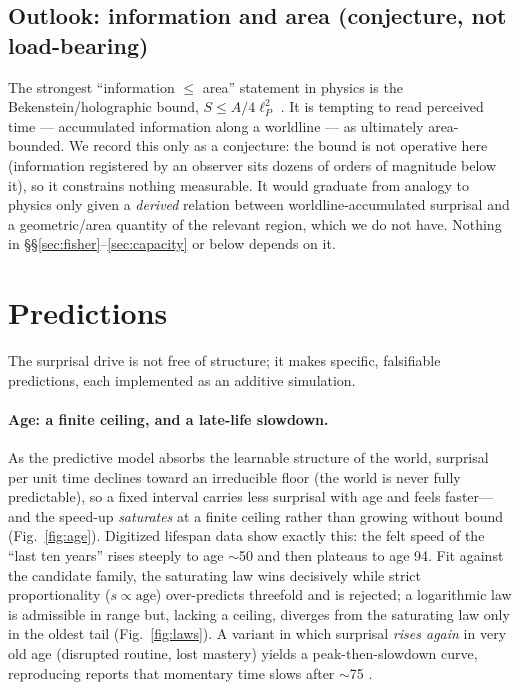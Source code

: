 \documentclass[11pt]{article}
\begin{document}
\subsection{Outlook: information and area (conjecture, not load-bearing)}
The strongest ``information $\le$ area'' statement in physics is the Bekenstein/holographic
bound, $S\le A/4\ell_P^2$ \citep{bekenstein1981}. It is tempting to read perceived time ---
accumulated information along a worldline --- as ultimately area-bounded. We record this only
as a conjecture: the bound is not operative here (information registered by an observer sits
dozens of orders of magnitude below it), so it constrains nothing measurable. It would
graduate from analogy to physics only given a \emph{derived} relation between
worldline-accumulated surprisal and a geometric/area quantity of the relevant region, which
we do not have. Nothing in \S\S\ref{sec:fisher}--\ref{sec:capacity} or below depends on it.

\section{Predictions}\label{sec:predictions}
The surprisal drive is not free of structure; it makes specific, falsifiable
predictions, each implemented as an additive simulation.

\paragraph{Age: a finite ceiling, and a late-life slowdown.}
As the predictive model absorbs the learnable structure of the world, surprisal per
unit time declines toward an irreducible floor (the world is never fully predictable),
so a fixed interval carries less surprisal with age and feels faster---and the speed-up
\emph{saturates} at a finite ceiling rather than growing without bound
(Fig.~\ref{fig:age}). Digitized lifespan data \citep{wittmann2005age} show exactly this:
the felt speed of the ``last ten years'' rises steeply to age $\sim$50 and then
plateaus to age 94. Fit against the candidate family, the saturating law wins
decisively while strict proportionality ($s\propto\mathrm{age}$) over-predicts
threefold and is rejected; a logarithmic law is admissible in range but, lacking a
ceiling, diverges from the saturating law only in the oldest tail
(Fig.~\ref{fig:laws}). A variant in which surprisal \emph{rises again} in very old age
(disrupted routine, lost mastery) yields a peak-then-slowdown curve, reproducing
reports that momentary time slows after $\sim$75 \citep{droitvolet2019slows}.
\end{document}
